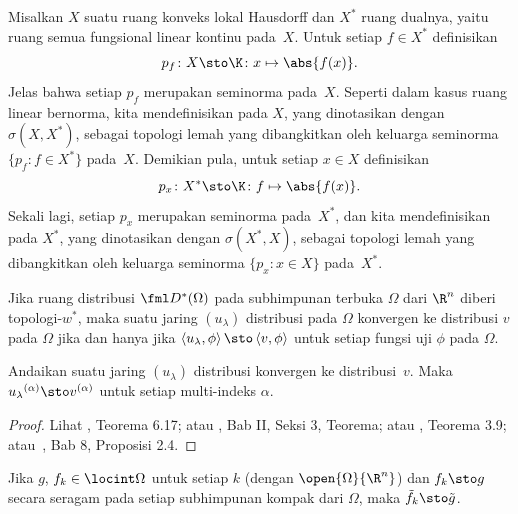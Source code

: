 \begin{defn} Misalkan $X$ suatu ruang konveks lokal Hausdorff dan $X^*$ ruang dualnya, yaitu ruang semua
fungsional linear kontinu pada~$X$. Untuk setiap $f \in X^*$ definisikan
  \[ p_f\colon X \sto \K\colon x \mapsto \abs{f(x)}. \]
Jelas bahwa setiap $p_f$ merupakan seminorma pada~$X$. Seperti dalam kasus ruang linear bernorma, kita mendefinisikan
 pada $X$, yang dinotasikan dengan $\sigma(X,X^*)$, sebagai topologi lemah yang dibangkitkan oleh keluarga seminorma
$\{p_f\colon f \in X^*\}$ pada~$X$. Demikian pula, untuk setiap $x \in X$ definisikan
   \[ p_x\colon X^* \sto \K \colon f \mapsto \abs{f(x)}. \]
Sekali lagi, setiap $p_x$ merupakan seminorma pada~$X^*$, dan kita mendefinisikan
 pada $X^*$, yang dinotasikan dengan $\sigma(X^*,X)$, sebagai topologi lemah yang dibangkitkan oleh keluarga seminorma
$\{p_x\colon x \in X\}$ pada~$X^*$.
\end{defn}

\begin{prop} Jika ruang distribusi $\fml D^*(\Omega)$ pada subhimpunan terbuka $\Omega$ dari $\R^n$ diberi topologi-$w^*$,
maka suatu jaring $(u_\lambda)$ distribusi pada $\Omega$ konvergen ke distribusi $v$ pada $\Omega$ jika dan hanya jika
$\left\langle u_\lambda, \phi\right\rangle \sto \left\langle v, \phi\right\rangle$ untuk setiap fungsi uji $\phi$ pada $\Omega$.
\end{prop}

\begin{prop} Andaikan suatu jaring $(u_\lambda)$ distribusi konvergen ke distribusi~$v$. Maka ${u_\lambda}^{(\alpha)} \sto v^{(\alpha)}$
untuk setiap multi-indeks $\alpha$.
\end{prop}

\begin{proof} Lihat \cite{Rudin:1991}, Teorema 6.17; atau \cite{Yosida:1965}, Bab II, Seksi 3, Teorema; atau \cite{Grubb:2009}, Teorema 3.9;
atau~\cite{HirschL:1999}, Bab 8, Proposisi 2.4.
\end{proof}

\begin{prop} Jika $g$, $f_k \in \locint\Omega$ untuk setiap $k$ (dengan $\open{\Omega}{\R^n}$) dan $f_k \sto g$ secara seragam pada
setiap subhimpunan kompak dari $\Omega$, maka $\tilde f_k \sto \tilde g$.
\end{prop}

